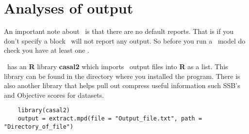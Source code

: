 \section{Analyses of output}\label{Sec:output}
An important note about \CNAME\ is that there are no default reports. That is if you don't specify a  block \CNAME\ will not report any output. So before you run a \CNAME\ model do check you have at least one .

\CNAME\ has an \textbf{R} library \textbf{casal2} which imports \CNAME\ output files into \textbf{R} as a list. This library can be found in the directory where you installed the program. There is also another library that helps pull out compress useful information such SSB's and Objective scores for datasets. 
{\small{\begin{verbatim}
	library(casal2)
	output = extract.mpd(file = "Output_file.txt", path = "Directory_of_file")
\end{verbatim}}}
